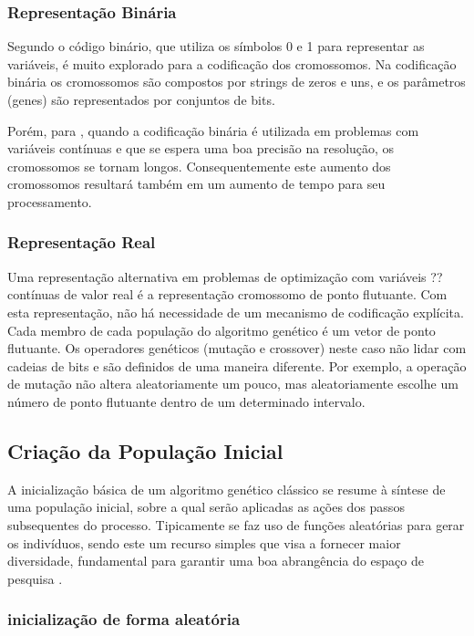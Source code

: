 \subsubsection{Representação Binária} 

Segundo \cite{mognon04} o código binário, que utiliza os símbolos 0 e 1 para representar as variáveis, é muito explorado para a codificação dos cromossomos. Na codificação binária os cromossomos são compostos por strings de zeros e uns, e os parâmetros (genes) são representados por conjuntos de bits. 

Porém, para \cite{catarina03}, quando a codificação binária é utilizada em problemas com variáveis contínuas e que se espera uma boa precisão na resolução, os cromossomos se tornam longos. Consequentemente este aumento dos cromossomos resultará também em um aumento de tempo para seu processamento.


\subsubsection{Representação Real}

Uma representação alternativa em problemas de optimização com variáveis ??contínuas de valor real é a representação cromossomo de ponto flutuante. Com esta representação, não há necessidade de um mecanismo de codificação explícita. Cada membro de cada população do algoritmo genético é um vetor de ponto flutuante. Os operadores genéticos (mutação e crossover) neste caso não lidar com cadeias de bits e são definidos de uma maneira diferente. Por exemplo, a operação de mutação não altera aleatoriamente um pouco, mas aleatoriamente escolhe um número de ponto flutuante dentro de um determinado intervalo.



\subsection{Criação da População Inicial}


A inicialização básica de um algoritmo genético clássico se resume à síntese de uma população inicial, sobre a qual serão aplicadas as ações dos passos subsequentes do processo. Tipicamente se faz uso de funções aleatórias para gerar os indivíduos, sendo este um recurso simples que visa a fornecer maior diversidade, fundamental para garantir uma boa abrangência do espaço de pesquisa \cite{goldberg02}. 

\subsubsection{inicialização de forma aleatória}

